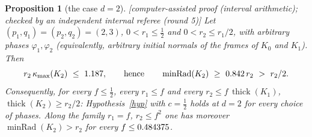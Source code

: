 \documentclass[10pt,a4paper]{article}
\theoremstyle{plain}
\newtheorem{proposition}[theorem]{Proposition}
\theoremstyle{definition}
\theoremstyle{remark}
\newcommand{\thick}{\operatorname{thick}}
\newcommand{\minRad}{\operatorname{minRad}}
\newcommand{\status}[1]{\textsf{\small [#1]}}
\begin{document}
\begin{proposition}[the case $d=2$]\label{prop:d2cert}\status{computer-assisted proof (interval arithmetic); checked by an independent internal referee (round 5)}
Let $(p_1,q_1)=(p_2,q_2)=(2,3)$, $0<r_1\le\frac12$ and $0<r_2\le r_1/2$, with arbitrary phases $\varphi_1,\varphi_2$ (equivalently, arbitrary initial normals of the frames of $K_0$ and $K_1$). Then
\[
r_2\,\kappa_{\max}(K_2)\ \le\ \DtwoCertBound,\qquad\text{hence}\qquad \minRad(K_2)\ \ge\ \DtwoCertMinRad\,r_2\ >\ r_2/2 .
\]
Consequently, for every $f\le\frac12$, every $r_1\le f$ and every $r_2\le f\,\thick(K_1)$, $\thick(K_2)\ge r_2/2$: Hypothesis~\ref{hyp} with $c=\frac12$ holds at $d=2$ for every choice of phases. Along the family $r_1=f$, $r_2\le f^2$ one has moreover $\minRad(K_2)>r_2$ for every $f\le0.484375$.
\end{proposition}
\end{document}
